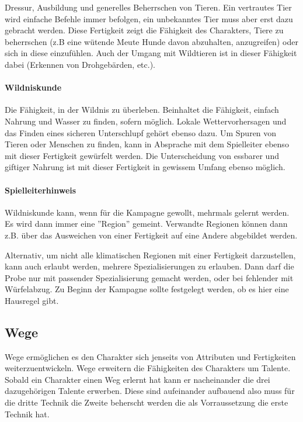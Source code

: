 \documentclass{article}
\begin{document}
Dressur, Ausbildung und generelles Beherrschen von Tieren. Ein vertrautes Tier wird einfache Befehle immer befolgen,
ein unbekanntes Tier muss aber erst dazu gebracht werden. Diese Fertigkeit zeigt die Fähigkeit des Charakters, Tiere
zu beherrschen (z.B eine wütende Meute Hunde davon abzuhalten, anzugreifen) oder sich in diese einzufühlen. Auch der Umgang mit
Wildtieren ist in dieser Fähigkeit dabei (Erkennen von Drohgebärden, etc.).

\paragraph{Wildniskunde}

Die Fähigkeit, in der Wildnis zu überleben. Beinhaltet die Fähigkeit, einfach Nahrung und Wasser zu finden, sofern
möglich. Lokale Wettervorhersagen und das Finden eines sicheren Unterschlupf gehört ebenso dazu. Um Spuren von
Tieren oder Menschen zu finden, kann in Absprache mit dem Spielleiter ebenso mit dieser Fertigkeit gewürfelt werden.
Die Unterscheidung von essbarer und giftiger Nahrung ist mit dieser Fertigkeit in gewissem Umfang ebenso möglich.

\begin{mdframed}[hidealllines=true, backgroundcolor=black!10]
\paragraph{Spielleiterhinweis}

Wildniskunde kann, wenn für die Kampagne gewollt, mehrmals gelernt werden. Es wird dann immer eine ''Region'' gemeint.
Verwandte Regionen können dann z.B. über das Ausweichen von einer Fertigkeit auf eine Andere abgebildet werden.

Alternativ, um nicht alle klimatischen Regionen mit einer Fertigkeit darzustellen, kann auch erlaubt werden, mehrere
Spezialisierungen zu erlauben. Dann darf die Probe nur mit passender Spezialisierung gemacht werden, oder bei
fehlender mit Würfelabzug. Zu Beginn der Kampagne sollte festgelegt werden, ob es hier eine Hausregel gibt.

\end{mdframed}
\begin{center}
\section{Wege}
\end{center}

Wege ermöglichen es den Charakter sich jenseits von Attributen und Fertigkeiten weiterzuentwickeln. Wege erweitern
die Fähigkeiten des Charakters um Talente.
Sobald ein Charakter einen Weg erlernt hat kann er nacheinander die drei dazugehörigen Talente erwerben. Diese
sind aufeinander aufbauend also muss für die dritte Technik die Zweite beherscht werden die als Vorraussetzung die
erste Technik hat.
\end{document}
